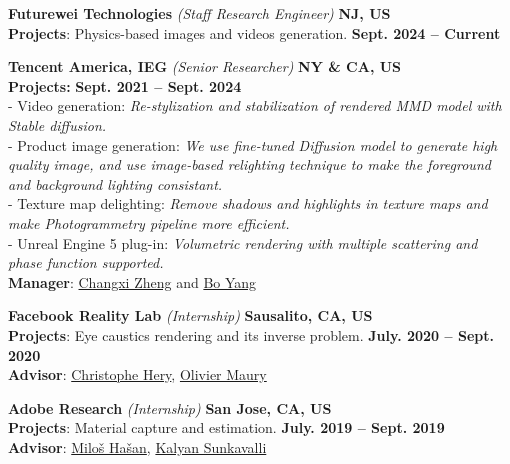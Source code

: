 \documentclass[margin,line]{resume}
\begin{document}
\begin{resume}
	\textbf{Futurewei Technologies} \textsl{(Staff Research Engineer)} \hfill \textbf{NJ, US} \\
	\textbf{Projects}: Physics-based images and videos generation. \hfill \textbf{Sept. 2024 -- Current} \hfill \\
	
	\vspace{0.0mm}
	
	\textbf{Tencent America, IEG} \textsl{(Senior Researcher)} \hfill \textbf{NY \& CA, US} \\
	\textbf{Projects:} \hfill \textbf{Sept. 2021 -- Sept. 2024} \hfill \\
	- Video generation: \textsl{Re-stylization and stabilization of rendered MMD model with Stable diffusion.} \\
	- Product image generation: \textsl{We use fine-tuned Diffusion model to generate high quality image, and use image-based relighting technique to make the foreground and background lighting consistant.} \\
	- Texture map delighting: \textsl{Remove shadows and highlights in texture maps and make Photogrammetry pipeline more efficient.} \\
	- Unreal Engine 5 plug-in: \textsl{Volumetric rendering with multiple scattering and phase function supported.} \\
	\textbf{Manager}: \href{https://www.cs.columbia.edu/~cxz/}{Changxi Zheng} and  \href{https://sites.google.com/site/boyanghome/home}{Bo Yang}
	
	\vspace{0.0mm}

	\textbf{Facebook Reality Lab} \textsl{(Internship)} \hfill \textbf{Sausalito, CA, US} \\
	\textbf{Projects}: Eye caustics rendering and its inverse problem. \hfill \textbf{July. 2020 -- Sept. 2020}\\
	\textbf{Advisor}: \href{https://graphics.pixar.com/library/indexAuthorChristophe_Hery.html}{Christophe Hery}, \href{https://www.imdb.com/name/nm1436524/}{Olivier Maury}       

    \vspace{0.0mm}

	\textbf{Adobe Research} \textsl{(Internship)} \hfill \textbf{San Jose, CA, US} \\
	\textbf{Projects}: Material capture and estimation. \hfill \textbf{July. 2019 -- Sept. 2019}\\
	\textbf{Advisor}: \href{http://miloshasan.net/}{Milo\v{s} Ha\v{s}an}, \href{https://research.adobe.com/person/kalyan-sunkavalli/}{Kalyan Sunkavalli}       


\end{resume}
\end{document}
